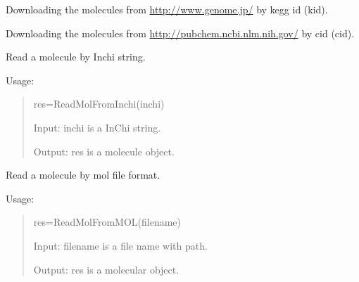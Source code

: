 \documentclass[letterpaper,10pt,english]{sphinxmanual}
\begin{document}

\begin{fulllineitems}
\label{reference/Getmol:Getmol.GetMolFromKegg}
Downloading the molecules from \url{http://www.genome.jp/} by kegg id (kid).

\end{fulllineitems}


\begin{fulllineitems}
\label{reference/Getmol:Getmol.GetMolFromNCBI}
Downloading the molecules from \url{http://pubchem.ncbi.nlm.nih.gov/} by cid (cid).

\end{fulllineitems}


\begin{fulllineitems}
\label{reference/Getmol:Getmol.ReadMolFromInchi}
Read a molecule by Inchi string.

Usage:
\begin{quote}

res=ReadMolFromInchi(inchi)

Input: inchi is a InChi string.

Output: res is a molecule object.
\end{quote}

\end{fulllineitems}


\begin{fulllineitems}
\label{reference/Getmol:Getmol.ReadMolFromMOL}
Read a  molecule by mol file format.

Usage:
\begin{quote}

res=ReadMolFromMOL(filename)

Input: filename is a file name with path.

Output: res is a  molecular object.
\end{quote}

\end{fulllineitems}
\end{document}
